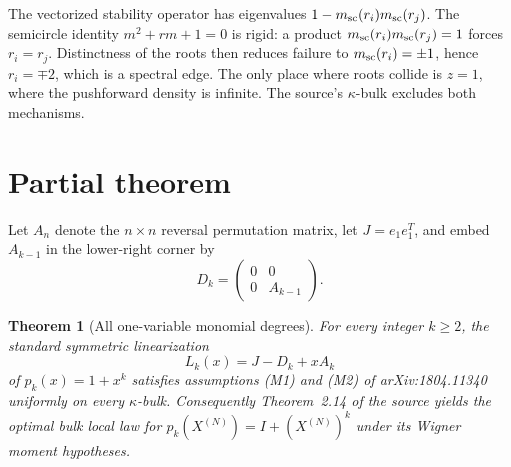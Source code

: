 \documentclass[11pt]{article}
\newtheorem{theorem}{Theorem}
\begin{document}
The vectorized stability operator has eigenvalues
$1-m_{\rm sc}(r_i)m_{\rm sc}(r_j)$. The semicircle identity
$m^2+rm+1=0$ is rigid: a product $m_{\rm sc}(r_i)m_{\rm sc}(r_j)=1$ forces
$r_i=r_j$. Distinctness of the roots then reduces failure to
$m_{\rm sc}(r_i)=\pm1$, hence $r_i=\mp2$, which is a spectral edge. The only
place where roots collide is $z=1$, where the pushforward density is infinite.
The source's $\kappa$-bulk excludes both mechanisms.

\section{Partial theorem}

Let $A_n$ denote the $n\times n$ reversal permutation matrix, let
$J=e_1e_1^T$, and embed $A_{k-1}$ in the lower-right corner by
\[
 D_k=\begin{pmatrix}0&0\\0&A_{k-1}\end{pmatrix}.
\]

\begin{theorem}[All one-variable monomial degrees]
For every integer $k\ge2$, the standard symmetric linearization
\begin{equation}\label{eq:pencil}
 L_k(x)=J-D_k+xA_k
\end{equation}
of $p_k(x)=1+x^k$ satisfies assumptions \textup{(M1)} and \textup{(M2)} of
arXiv:1804.11340 uniformly on every $\kappa$-bulk. Consequently Theorem~2.14
of the source yields the optimal bulk local law for
$p_k(X^{(N)})=I+(X^{(N)})^k$ under its Wigner moment hypotheses.
\end{theorem}
\end{document}
